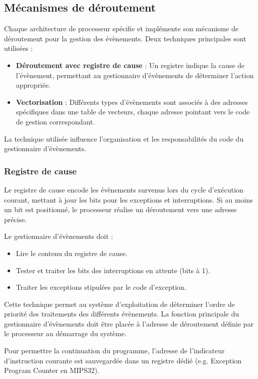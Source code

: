 \subsection{Mécanismes de déroutement}

Chaque architecture de processeur spécifie et implémente son mécanisme de déroutement pour la gestion des évènements. Deux techniques principales sont utilisées :

\begin{itemize}
    \item \textbf{Déroutement avec registre de cause} : Un registre indique la cause de l'évènement, permettant au gestionnaire d'évènements de déterminer l'action appropriée.
    \item \textbf{Vectorisation} : Différents types d'évènements sont associés à des adresses spécifiques dans une table de vecteurs, chaque adresse pointant vers le code de gestion correspondant.
\end{itemize}

La technique utilisée influence l'organisation et les responsabilités du code du gestionnaire d'évènements.


\subsubsection{Registre de cause}

Le registre de cause encode les évènements survenus lors du cycle d’exécution courant, mettant à jour les bits pour les exceptions et interruptions. Si au moins un bit est positionné, le processeur réalise un déroutement vers une adresse précise.

Le gestionnaire d’évènements doit :
\begin{itemize}
    \item Lire le contenu du registre de cause.
    \item Tester et traiter les bits des interruptions en attente (bits à 1).
    \item Traiter les exceptions stipulées par le code d’exception.
\end{itemize}

Cette technique permet au système d’exploitation de déterminer l’ordre de priorité des traitements des différents évènements. La fonction principale du gestionnaire d’évènements doit être placée à l’adresse de déroutement définie par le processeur au démarrage du système.

Pour permettre la continuation du programme, l’adresse de l’indicateur d’instruction courante est sauvegardée dans un registre dédié (e.g. Exception Program Counter en MIPS32).


